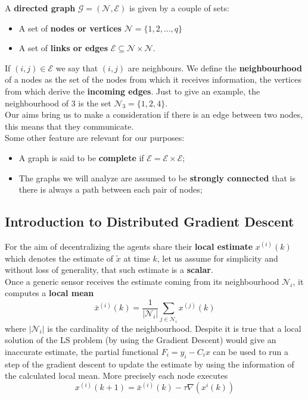 \noindent
A \textbf{directed graph} $\mathcal{G}=(\mathcal{N}, \mathcal{E})$ is given by a couple of sets:
\begin{itemize}
    \item A set of \textbf{nodes or vertices} $\mathcal{N}=\{1,2,..., q\}$
    \item A set of \textbf{links or edges} $\mathcal{E}\subseteq\mathcal{N} \times  \mathcal{N}.$
\end{itemize}
If $(i,j)\in\mathcal{E}$ we say that $(i,j)$ are neighbours. We define the \textbf{neighbourhood} of a nodes as the set of the nodes from which it receives information, the vertices from which derive the \textbf{incoming edges}. Just to give an example, the neighbourhood of 3 is the set $\mathcal{N}_3=\{1,2,4\}$. \\
Our aims bring us to make a consideration if there is an edge between two nodes, this means that they communicate.\\
Some other feature are relevant for our purposes: 
\begin{itemize}
    \item A graph is said to be \textbf{complete} if $\mathcal{E}=\mathcal{E} \times \mathcal{E}$; 
    \item The graphs we will analyze are assumed to be \textbf{strongly connected} that is there is always a path between each pair of nodes; 
\end{itemize}

\subsection{Introduction to Distributed Gradient Descent}
For the aim of decentralizing the agents share their \textbf{local estimate} $x^{(i)}(k)$ which denotes the {\color{red} estimate of $\tilde{x}$ at time $k$}, let us assume for simplicity and without loss of generality, that such estimate is a \textbf{scalar}. \\
Once a generic sensor receives the estimate coming from its neighbourhood $\mathcal{N}_i$, it computes a \textbf{local mean}
\begin{equation}
    \bar{x}^{(i)}(k) = \frac{1}{\vert \mathcal{N}_i \vert} \sum_{j\in\mathcal{N}_i} x^{(j)}(k)
\end{equation}
where $\vert \mathcal{N}_i \vert$ is the cardinality of the neighbourhood. Despite it is true that a local solution of the LS problem (by using the Gradient Descent) would give an inaccurate estimate, the partial functional $F_i=y_i-C_ix$ can be used to run a step of the gradient descent to update the estimate by using the information of the calculated local mean. More precisely each node executes
\begin{equation}    \label{eq:DGD_1}
    x^{(i)}(k+1) = \bar{x}^{(i)}(k) -\tau \nabla (x^{i}(k))
\end{equation}

